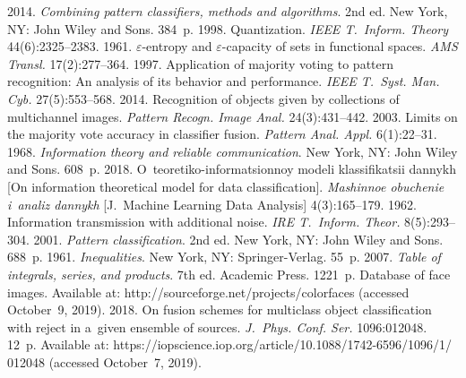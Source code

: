 \begin{multicols}{2}
{\small\frenchspacing
{\baselineskip=10.45pt
\begin{thebibliography}{99}
 2014. \textit{Combining pattern classifiers, methods and algorithms}. 2nd ed. 
New York, NY: John Wiley and Sons. 384~p.
 1998. Quantization. 
\textit{IEEE T.~Inform. Theory} 44(6):2325--2383.
 1961. 
\mbox{$\varepsilon$-entropy} and  $\varepsilon$-capacity of sets in 
functional spaces. \textit{AMS Transl.} 17(2):277--364.
 1997. 
Application of majority voting to pattern recognition: An 
analysis of its behavior and performance. \textit{IEEE T.~Syst. Man. Cyb.}
27(5):553--568.
2014. Recognition of objects given by collections of 
multichannel images. \textit{Pattern Recogn. Image Anal.} 24(3):431--442.
 2003. Limits on the majority
vote accuracy in classifier fusion. \textit{Pattern Anal. Appl.} 6(1):22--31.
 1968. 
\textit{Information theory and reliable communication}. New York, NY: John Wiley and 
Sons. 608~p.
 2018. 
O~teoretiko-informatsionnoy modeli klassifikatsii
dannykh [On information theoretical model for data classification]. 
\textit{Mashinnoe obuchenie i~analiz dannykh}  [J.~Machine Learning Data Analysis] 
4(3):165--179.
 1962. 
Information transmission with additional noise. 
\textit{IRE T.~Inform. Theor.} 8(5):293--304.
 2001. \textit{Pattern classification}. 2nd ed. New York, NY: John Wiley and Sons. 
688~p.
 1961. 
\textit{Inequalities}. New York, NY: Springer-Verlag. 55~p.
 2007. \textit{Table of integrals, series, and products}. 7th ed. 
Academic Press. 1221~p.
Database of face images. Available at:
{\sf http://\linebreak sourceforge.net/projects/colorfaces} (accessed 
October~9, 2019).
2018. On fusion schemes for multiclass object 
classification with reject in a~given ensemble of sources. 
\textit{J.~Phys. Conf. Ser.} 1096:012048. 12~p. Available at: 
{\sf https://\linebreak iopscience.iop.org/article/10.1088/1742-6596/1096/1/ 012048}
 (accessed October~7,  2019).
 \end{thebibliography} } }

\end{multicols}

